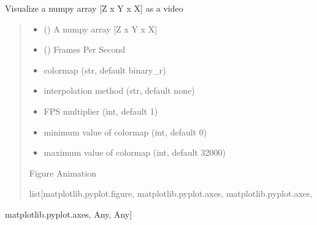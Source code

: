 \documentclass[letterpaper,10pt,english]{sphinxmanual}
\begin{document}
\begin{fulllineitems}
\label{\detokenize{Visualization:Visualization.view_image}}
\pysigstartsignatures
{}
\pysigstopsignatures
\sphinxAtStartPar
Visualize a numpy array {[}Z x Y x X{]} as a video
\begin{quote}\begin{description}
\begin{itemize}
\item {} 
\sphinxAtStartPar
{} () \textendash{} A numpy array {[}Z x Y x X{]}

\item {} 
\sphinxAtStartPar
{} () \textendash{} Frames Per Second

\item {} 
\sphinxAtStartPar
{} \textendash{} colormap (str, default binary\_r)

\item {} 
\sphinxAtStartPar
{} \textendash{} interpolation method (str, default none)

\item {} 
\sphinxAtStartPar
{} \textendash{} FPS multiplier (int, default 1)

\item {} 
\sphinxAtStartPar
{} \textendash{} minimum value of colormap (int, default 0)

\item {} 
\sphinxAtStartPar
{} \textendash{} maximum value of colormap (int, default 32000)

\end{itemize}

\sphinxAtStartPar
Figure Animation

\sphinxAtStartPar
list{[}matplotlib.pyplot.figure, matplotlib.pyplot.axes, matplotlib.pyplot.axes,

\end{description}\end{quote}

\sphinxAtStartPar
matplotlib.pyplot.axes, Any, Any{]}

\end{fulllineitems}
\end{document}
